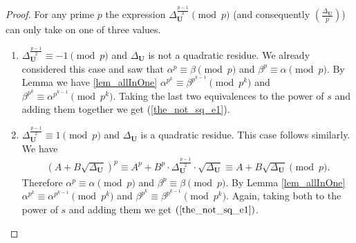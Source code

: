 \documentclass[preprint,12pt]{elsarticle}
\newcommand{\Li}[2]{\left(\frac{#1}{#2}\right)}
\begin{document}
\begin{proof}
    
For any prime $p$ the expression $\Delta_\mathbf{U}^\frac{p-1}{2} \pmod p$ (and consequently $\Li{\Delta_\mathbf{U}}{p}$) can only take on one of three values. 
\begin{enumerate}
    \item $\Delta_\mathbf{U}^\frac{p-1}{2} \equiv -1 \pmod p$ and $\Delta_\mathbf{U}$ is not a quadratic residue. We already considered this case and saw that
    $\alpha^p\equiv\beta\pmod p$ and $\beta^p \equiv \alpha\pmod p$. By Lemma we have \ref{lem_allInOne}  $\alpha^{p^k}\equiv\beta^{p^{k-1}}\pmod {p^k}$ and $\beta^{p^k}\equiv\alpha^{p^{k-1}}\pmod {p^k}$. Taking the last two equivalences to the power of $s$ and adding them together we get (\ref{the_not_sq_e1}).

    
    \item $\Delta_\mathbf{U}^\frac{p-1}{2} \equiv 1 \pmod p$ and $\Delta_\mathbf{U}$ is a quadratic residue. This case follows similarly. We have
     \begin{align}
         \left(A+B\sqrt{\Delta_{\mathbf U}}\right)^p \equiv
         A^p + B^p\cdot \Delta_{\mathbf U}^{\frac{p-1}{2}} \cdot \sqrt{\Delta_{\mathbf U}} \equiv
         A + B\sqrt{\Delta_{\mathbf U}}
         \pmod{p}.
    \end{align}
    Therefore $\alpha^p\equiv\alpha\pmod p$ and $\beta^p \equiv \beta\pmod p$.  By Lemma \ref{lem_allInOne}  $\alpha^{p^k}\equiv\alpha^{p^{k-1}}\pmod {p^k}$ and $\beta^{p^k}\equiv\beta^{p^{k-1}}\pmod {p^k}$. Again, taking both to the power of $s$ and adding them we get $(\ref{the_not_sq_e1})$.


\end{enumerate}
\end{proof}
\end{document}
